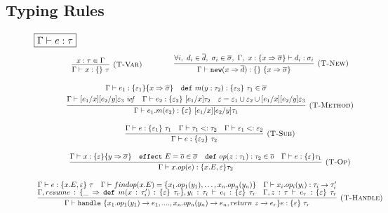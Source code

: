 \documentclass{article}
\theoremstyle{definition}
\newcommand{\keywadj}[1]{\mathtt{#1}}
\newcommand{\keyw}[1]{\keywadj{#1}~}
\begin{document}
\subsection{Typing Rules}
\begin{figure}[H]
\footnotesize{
\noindent$\fbox{$\Gamma \vdash e : \tau$}$
\[
\begin{array}{c}


\infer[\textsc{(T-Var)}]
  {\Gamma \vdash x : \{ \}~\tau}
  {x : \tau \in \Gamma} \quad \quad
~~~~~~~
\infer[\textsc{(T-New)}]
	{\Gamma \vdash \keywadj{new} (x \Rightarrow \overline{d}) : \{ \}~\{ x \Rightarrow \overline{\sigma} \}}
	{\forall i,~d_i \in \overline{d},~\sigma_i \in \overline{\sigma},~\Gamma,~x : \{ x \Rightarrow \overline{\sigma} \} \vdash d_i : \sigma_i}\\[3ex]
\infer[\textsc{(T-Method)}]
  {\Gamma \vdash e_1.m(e_2) : \{ \varepsilon \}~[e_1/x][e_2/y]\tau_1}
  {\begin{gathered} \Gamma \vdash e_1 : \{ \varepsilon_1 \} \{ x \Rightarrow \overline{\sigma} \}\quad \keyw{def} m(y : \tau_2) : \{ \varepsilon_3 \}~\tau_1 \in \overline{\sigma}\\
  \Gamma \vdash [e_1/x][e_2/y]\varepsilon_3~\mathit{wf}\quad \Gamma \vdash e_2 : \{ \varepsilon_2 \}~[e_1/x]\tau_2 \quad \varepsilon = \varepsilon_1 \cup \varepsilon_2 \cup [e_1/x][e_2/y]\varepsilon_3 \end{gathered}}\\[3ex]

\infer[\textsc{(T-Sub)}]
  {\Gamma \vdash e : \{ \varepsilon_2 \}~\tau_2}
  {\Gamma \vdash e : \{ \varepsilon_1 \}~\tau_1 & \Gamma \vdash \tau_1 <: \tau_2 & \Gamma \vdash \varepsilon_1 <: \varepsilon_2} \\[3ex]

\infer[\textsc{(T-Op)}]
  {\Gamma \vdash x.op(e): \{x.E, \varepsilon\} \tau_2 }
  {\Gamma \vdash x: \{\varepsilon\} \{y \Rightarrow \overline{\sigma}\} \quad
   \keyw{effect} E = \overline{o} \in \overline{\sigma} \quad 
   \keyw{def} op(z: \tau_1): \tau_2 \in \overline{o} \quad 
   \Gamma \vdash e: \{\varepsilon \} \tau_1
  }
  \\[3ex]
  
  \infer[\textsc{(T-Handle)}]
  {\Gamma \vdash \keyw{handle} \{x_1.op_1(y_1)\rightarrow e_1, ...., x_n.op_n(y_n)\rightarrow e_n, return\ z\rightarrow e_r\} e: \{\varepsilon\}\ \tau_r }
  {\Gamma \vdash e: \{x.E, \varepsilon\}\ \tau \quad 
  \Gamma \vdash findop(x.E) = \{x_1.op_1(y_1), \dots, x_n.op_n(y_n)\} \quad
   \Gamma \vdash x_i.op_i(y_i) : \tau_i \rightarrow \tau_i'\\  
   \Gamma, resume: \{\_ \Rightarrow \keyw{def} m(x: \tau_i') : \{\varepsilon\}\ \tau_r\} , y_i:\tau_i \vdash e_i: \{\varepsilon\}\ \tau_r \quad \Gamma, z:\tau \vdash e_r: \{\varepsilon\}\ \tau_r
  }\\[3ex]
\end{array}
\]

}
\end{figure}
\end{document}
